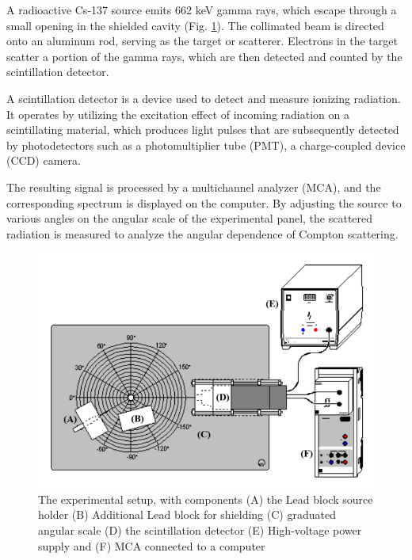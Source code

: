 A radioactive Cs-137 source emits
662 keV gamma rays, which escape through a small
opening in the shielded cavity (Fig. \ref{th:2}). The collimated beam
is directed onto an aluminum rod, serving as the
target or scatterer.
Electrons in the target scatter a portion of the gamma rays, which are then
detected and counted by the scintillation detector.

A scintillation detector is a device used to detect and
measure ionizing radiation. It operates by utilizing
the excitation effect of incoming radiation on a scintillating material, which produces light pulses that
are subsequently detected by photodetectors such as a photomultiplier
tube (PMT), a charge-coupled device (CCD) camera.

The resulting signal is processed by a multichannel
analyzer (MCA), and the corresponding spectrum is
displayed on the computer. By adjusting the source
to various angles on the angular scale of the experimental panel, the scattered radiation is measured to analyze the angular dependence of Compton scattering.

\begin{figure}
    \centering
    \includegraphics[width=1\columnwidth]{images/setup.png}
    \caption{The experimental setup, with components (A) the Lead block source holder (B) Additional Lead block for shielding (C) graduated angular scale (D) the scintillation detector (E) High-voltage power supply and (F) MCA connected to a computer}
    \label{th:2}
\end{figure}
